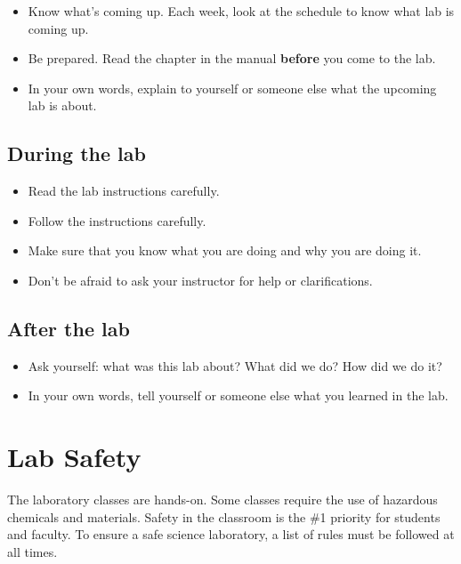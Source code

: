 \documentclass[]{book}
\providecommand{\tightlist}{%
  \setlength{\itemsep}{0pt}\setlength{\parskip}{0pt}}
\theoremstyle{definition}
\theoremstyle{definition}
\theoremstyle{definition}
\theoremstyle{remark}
\begin{document}
\begin{itemize}
\tightlist
\item
  Know what's coming up. Each week, look at the schedule to know what
  lab is coming up.
\item
  Be prepared. Read the chapter in the manual \textbf{before} you come
  to the lab.
\item
  In your own words, explain to yourself or someone else what the
  upcoming lab is about.
\end{itemize}

\section*{During the lab}\label{during-the-lab}

\begin{itemize}
\tightlist
\item
  Read the lab instructions carefully.
\item
  Follow the instructions carefully.
\item
  Make sure that you know what you are doing and why you are doing it.
\item
  Don't be afraid to ask your instructor for help or clarifications.
\end{itemize}

\section*{After the lab}\label{after-the-lab}

\begin{itemize}
\tightlist
\item
  Ask yourself: what was this lab about? What did we do? How did we do
  it?
\item
  In your own words, tell yourself or someone else what you learned in
  the lab.
\end{itemize}

\chapter{Lab Safety}\label{lab-safety}

The laboratory classes are hands-on. Some classes require the use of
hazardous chemicals and materials. Safety in the classroom is the \#1
priority for students and faculty. To ensure a safe science laboratory,
a list of rules must be followed at all times.
\end{document}
